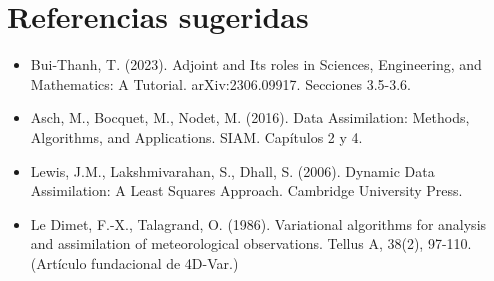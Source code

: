 \documentclass[12pt,spanish,mexico]{article}
\numberwithin{equation}{section}
\theoremstyle{definition}
\theoremstyle{remark}
\begin{document}
\section*{Referencias sugeridas}
\begin{itemize}
\item Bui-Thanh, T. (2023). Adjoint and Its roles in Sciences, Engineering, and Mathematics: A Tutorial. arXiv:2306.09917. Secciones 3.5-3.6.
\item Asch, M., Bocquet, M., Nodet, M. (2016). Data Assimilation: Methods, Algorithms, and Applications. SIAM. Capítulos 2 y 4.
\item Lewis, J.M., Lakshmivarahan, S., Dhall, S. (2006). Dynamic Data Assimilation: A Least Squares Approach. Cambridge University Press.
\item Le Dimet, F.-X., Talagrand, O. (1986). Variational algorithms for analysis and assimilation of meteorological observations. Tellus A, 38(2), 97-110. (Artículo fundacional de 4D-Var.)
\end{itemize}
\end{document}

